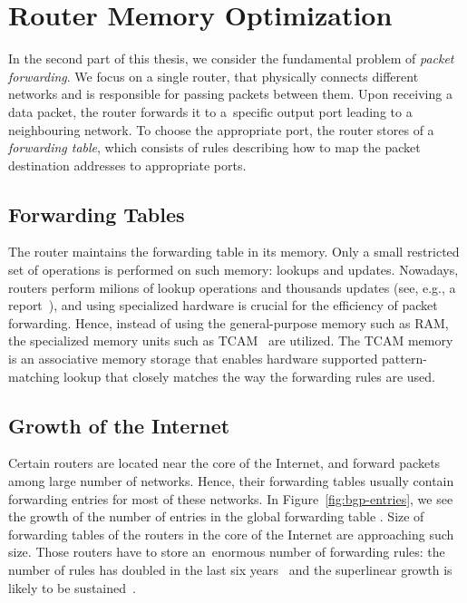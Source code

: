 \section{Router Memory Optimization}
\label{sec:intro-packet-forwarding}


In the second part of this thesis, we consider the fundamental problem of \emph{packet forwarding}.
We focus on a single router, that physically connects different networks and is responsible for passing packets between them.
Upon receiving a data packet, the router forwards it to a~specific output port leading to a neighbouring network.
To choose the appropriate port, the router stores of a \emph{forwarding table}, which consists of rules describing how to map the packet destination addresses to appropriate ports.

\subsection{Forwarding Tables}

The router maintains the forwarding table in its memory.
Only a small restricted set of operations is performed on such memory: lookups and updates.
Nowadays, routers perform milions of lookup operations and thousands updates (see, e.g., a report~\cite{bgp-updates}), and using specialized hardware is crucial for the efficiency of packet forwarding.
Hence, instead of using the general-purpose memory such as RAM, the specialized memory units such as TCAM~\cite{tcam-memory} are utilized.
The TCAM memory is an associative memory storage that enables hardware supported pattern-matching lookup that closely matches the way the forwarding rules are used.

\subsection{Growth of the Internet}

Certain routers are located near the core of the Internet, and forward packets among large number of networks.
Hence, their forwarding tables usually contain forwarding entries for most of these networks.
In Figure~\ref{fig:bgp-entries}, we see the growth of the number of entries in the global forwarding table \cite{url-bgp-entries}.
Size of forwarding tables of the routers in the core of the Internet are approaching such size.
Those routers have to store an~enormous number of forwarding rules: the
number of rules has doubled in the last six years~\cite{bgp-routeviews} and
the superlinear growth is likely to be sustained~\cite{steve-myth}.


